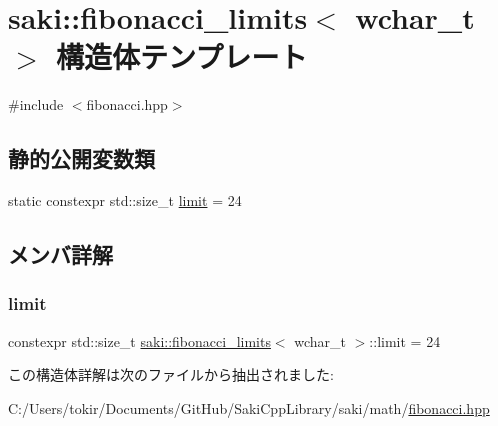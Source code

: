 \hypertarget{structsaki_1_1fibonacci__limits_3_01wchar__t_01_4}{}\section{saki\+:\+:fibonacci\+\_\+limits$<$ wchar\+\_\+t $>$ 構造体テンプレート}
\label{structsaki_1_1fibonacci__limits_3_01wchar__t_01_4}


{\ttfamily \#include $<$fibonacci.\+hpp$>$}

\subsection*{静的公開変数類}
\begin{DoxyCompactItemize}
\item 
static constexpr std\+::size\+\_\+t \mbox{\hyperlink{structsaki_1_1fibonacci__limits_3_01wchar__t_01_4_a923d2a384d06cda8c9e10939161e909d}{limit}} = 24
\end{DoxyCompactItemize}


\subsection{メンバ詳解}
\mbox{\label{structsaki_1_1fibonacci__limits_3_01wchar__t_01_4_a923d2a384d06cda8c9e10939161e909d}} 
\subsubsection{\texorpdfstring{limit}{limit}}
{\footnotesize\ttfamily constexpr std\+::size\+\_\+t \mbox{\hyperlink{structsaki_1_1fibonacci__limits}{saki\+::fibonacci\+\_\+limits}}$<$ wchar\+\_\+t $>$\+::limit = 24\hspace{0.3cm}{\ttfamily [static]}}



この構造体詳解は次のファイルから抽出されました\+:\begin{DoxyCompactItemize}
\item 
C\+:/\+Users/tokir/\+Documents/\+Git\+Hub/\+Saki\+Cpp\+Library/saki/math/\mbox{\hyperlink{fibonacci_8hpp}{fibonacci.\+hpp}}\end{DoxyCompactItemize}
